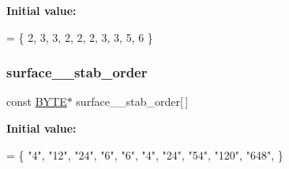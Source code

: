 {\bfseries Initial value\+:}
\begin{DoxyCode}
= \{ 2, 3, 3, 2, 2, 2, 3, 3, 5, 6
    \}
\end{DoxyCode}
\mbox{\label{surface__19_8_c_a0b7917f15a610ca524da362b484ddce3}} 
\subsubsection{\texorpdfstring{surface\+\_\+\_\+stab\+\_\+order}{surface\_19\_stab\_order}}
{\footnotesize\ttfamily const \mbox{\hyperlink{galois_8h_ab6cc7b4aeb6ea31aba2b3fbfc83ff5e6}{B\+Y\+TE}}$\ast$ surface\+\_\+\_\+stab\+\_\+order\mbox{[}$\,$\mbox{]}}

{\bfseries Initial value\+:}
\begin{DoxyCode}
= \{
    \textcolor{stringliteral}{"4"},
    \textcolor{stringliteral}{"12"},
    \textcolor{stringliteral}{"24"},
    \textcolor{stringliteral}{"6"},
    \textcolor{stringliteral}{"6"},
    \textcolor{stringliteral}{"4"},
    \textcolor{stringliteral}{"24"},
    \textcolor{stringliteral}{"54"},
    \textcolor{stringliteral}{"120"},
    \textcolor{stringliteral}{"648"},
\}
\end{DoxyCode}
